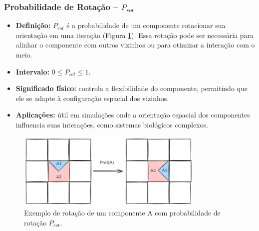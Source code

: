 \documentclass[12pt,oneside]{report}
\begin{document}
\subsubsection{Probabilidade de Rotação – \texorpdfstring{$P_{rot}$}{Prot}}
\label{subsubsec:Prot}

\begin{itemize}
    \item \textbf{Definição:} $P_{rot}$ é a probabilidade de um componente rotacionar sua orientação em uma iteração (Figura \ref{fig:rotacao}). Essa rotação pode ser necessária para alinhar o componente com outros vizinhos ou para otimizar a interação com o meio.
    \item \textbf{Intervalo:} $0 \le P_{rot} \le 1$.
    \item \textbf{Significado físico:} controla a flexibilidade do componente, permitindo que ele se adapte à configuração espacial dos vizinhos.
    \item \textbf{Aplicações:} útil em simulações onde a orientação espacial dos componentes influencia suas interações, como sistemas biológicos complexos.
\end{itemize}

\begin{figure}[H]
    \centering
    \includegraphics[width=0.8\textwidth]{rotacao.png}
    \caption{\small Exemplo de rotação de um componente A com probabilidade de rotação $P_{rot}$.}
    \label{fig:rotacao}
\end{figure}
\end{document}

